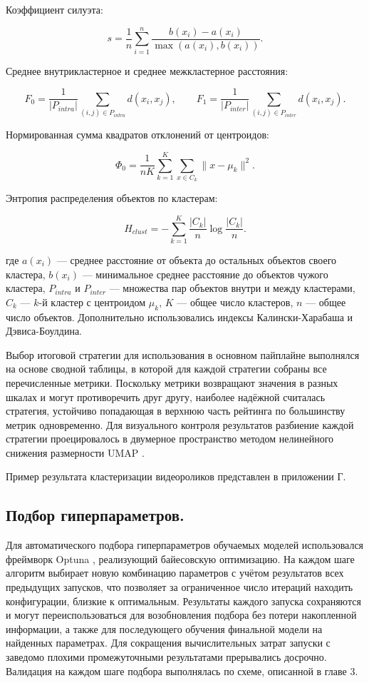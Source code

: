 \documentclass[times]{itmo-student-thesis}
\begin{document}
Коэффициент силуэта:

\[
s=\frac{1}{n}\sum_{i=1}^{n}\frac{b(x_i)-a(x_i)}{\max(a(x_i),b(x_i))}.
\]

Среднее внутрикластерное и среднее межкластерное расстояния:

\[
F_0=\frac{1}{|P_{intra}|}\sum_{(i,j)\in P_{intra}}d(x_i,x_j), \qquad
F_1=\frac{1}{|P_{inter}|}\sum_{(i,j)\in P_{inter}}d(x_i,x_j).
\]

Нормированная сумма квадратов отклонений от центроидов:

\[
\Phi_0=\frac{1}{nK}\sum_{k=1}^{K}\sum_{x\in C_k}\lVert x-\mu_k\rVert^2.
\]

Энтропия распределения объектов по кластерам:

\[
H_{clust}=-\sum_{k=1}^{K}\frac{|C_k|}{n}\log\frac{|C_k|}{n}.
\]

где $a(x_i)$ — среднее расстояние от объекта до остальных объектов своего кластера, $b(x_i)$ — минимальное среднее расстояние до объектов чужого кластера, $P_{intra}$ и $P_{inter}$ — множества пар объектов внутри и между кластерами, $C_k$ — $k$-й кластер с центроидом $\mu_k$, $K$ — общее число кластеров, $n$ — общее число объектов. Дополнительно использовались индексы Калински-Харабаша и Дэвиса-Боулдина.

Выбор итоговой стратегии для использования в основном пайплайне выполнялся на основе сводной таблицы, в которой для каждой стратегии собраны все перечисленные метрики. Поскольку метрики возвращают значения в разных шкалах и могут противоречить друг другу, наиболее надёжной считалась стратегия, устойчиво попадающая в верхнюю часть рейтинга по большинству метрик одновременно. Для визуального контроля результатов разбиение каждой стратегии проецировалось в двумерное пространство методом нелинейного снижения размерности UMAP \cite{mcinnes2018umap}.

Пример результата кластеризации видеороликов представлен в приложении Г.

\subsection{Подбор гиперпараметров.}

Для автоматического подбора гиперпараметров обучаемых моделей использовался фреймворк Optuna \cite{akiba2019optuna}, реализующий байесовскую оптимизацию. На каждом шаге алгоритм выбирает новую комбинацию параметров с учётом результатов всех предыдущих запусков, что позволяет за ограниченное число итераций находить конфигурации, близкие к оптимальным. Результаты каждого запуска сохраняются и могут переиспользоваться для возобновления подбора без потери накопленной информации, а также для последующего обучения финальной модели на найденных параметрах. Для сокращения вычислительных затрат запуски с заведомо плохими промежуточными результатами прерывались досрочно. Валидация на каждом шаге подбора выполнялась по схеме, описанной в главе 3.
\end{document}
